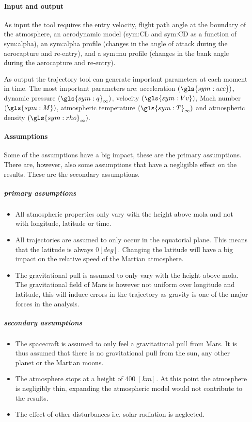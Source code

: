 \paragraph{Input and output}
As input the tool requires the entry velocity, flight path angle at the boundary of the atmosphere, an aerodynamic model (\gls{sym:CL} and \gls{sym:CD} as a function of \gls{sym:alpha}), an \gls{sym:alpha} profile (changes in the angle of attack during the aerocapture and re-entry), and a \gls{sym:mu} profile (changes in the bank angle during the aerocapture and re-entry).

As output the trajectory tool can generate important parameters at each moment in time. The most important parameters are: acceleration $\left(\gls{sym:acc}\right)$, dynamic pressure $\left(\gls{sym:q}_{\infty}\right)$, velocity $\left(\gls{sym:Vv}\right)$, Mach number $\left(\gls{sym:M}\right)$, atmospheric temperature $\left(\gls{sym:T}_{\infty}\right)$ and atmospheric density $\left(\gls{sym:rho}_{\infty}\right)$.


\paragraph{Assumptions}
 \label{sec:astroassumption}
 Some of the assumptions have a big impact, these are the primary assumptions. There are, however, also some assumptions that have a negligible effect on the results. These are the secondary assumptions.
 
 \subparagraph{primary assumptions}
 \begin{itemize}
 \item All atmospheric properties only vary with the height above \gls{mola} and not with longitude, latitude or time. 
 \item All trajectories are assumed to only occur in the equatorial plane. This means that the latitude is always $0 \left[deg\right]$. Changing the latitude will have a big impact on the relative speed of the Martian atmosphere.
 \item The gravitational pull is assumed to only vary with the height above \gls{mola}. The gravitational field of Mars is however not uniform over longitude and latitude, this will induce errors in the trajectory as gravity is one of the major forces in the analysis.
 \end{itemize}

 \subparagraph{secondary assumptions}
 \begin{itemize}
 \item The spacecraft is assumed to only feel a gravitational pull from Mars. It is thus assumed that there is no gravitational pull from the sun, any other planet or the Martian moons.
 \item The atmosphere stops at a height of 400 $\left[km\right]$. At this point the atmosphere is negligibly thin, expanding the atmospheric model would not contribute to the results.
 \item The effect of other disturbances i.e. solar radiation is neglected.
 \end{itemize}

